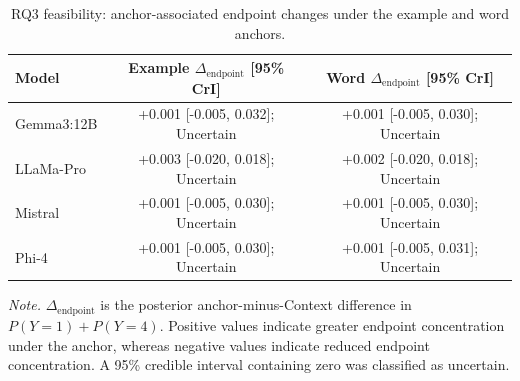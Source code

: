\begin{table}[tbp]
\caption{RQ3 feasibility: anchor-associated endpoint changes under the example and word anchors.}
\label{tab:rq3-feasibility-anchor-patterns}
\begin{tabular}{lcc}
\toprule
Model & Example $\Delta_{\mathrm{endpoint}}$ [95\% CrI] & Word $\Delta_{\mathrm{endpoint}}$ [95\% CrI] \\
\midrule
Gemma3:12B & +0.001 [-0.005, 0.032]; Uncertain & +0.001 [-0.005, 0.030]; Uncertain \\
LLaMa-Pro & +0.003 [-0.020, 0.018]; Uncertain & +0.002 [-0.020, 0.018]; Uncertain \\
Mistral & +0.001 [-0.005, 0.030]; Uncertain & +0.001 [-0.005, 0.030]; Uncertain \\
Phi-4 & +0.001 [-0.005, 0.030]; Uncertain & +0.001 [-0.005, 0.031]; Uncertain \\
\bottomrule
\end{tabular}
\vspace{2pt}
\begin{minipage}{\linewidth}
\footnotesize\textit{Note.} $\Delta_{\mathrm{endpoint}}$ is the posterior anchor-minus-Context difference in $P(Y=1)+P(Y=4)$. Positive values indicate greater endpoint concentration under the anchor, whereas negative values indicate reduced endpoint concentration. A 95\% credible interval containing zero was classified as uncertain.
\end{minipage}
\end{table}
